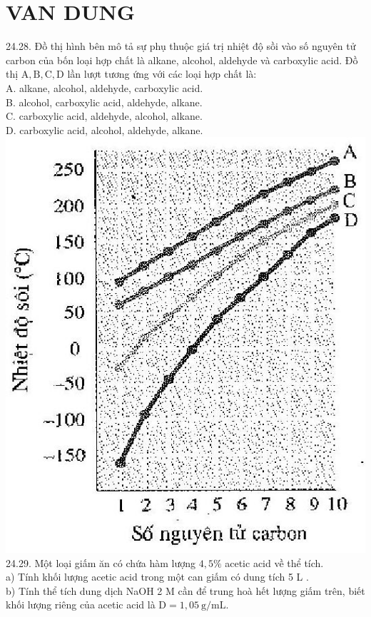 \documentclass[10pt]{article}
\begin{document}
\section*{VAN DUNG}
24.28. Đồ thị hình bên mô tả sự phụ thuộc giá trị nhiệt độ sồi vào số nguyên tử carbon của bốn loại hợp chất là alkane, alcohol, aldehyde và carboxylic acid. Đồ thị $\mathrm{A}, \mathrm{B}, \mathrm{C}, \mathrm{D}$ lần lượt tương ứng với các loại hợp chất là:\\
A. alkane, alcohol, aldehyde, carboxylic acid.\\
B. alcohol, carboxylic acid, aldehyde, alkane.\\
C. carboxylic acid, aldehyde, alcohol, alkane.\\
D. carboxylic acid, alcohol, aldehyde, alkane.\\
\includegraphics[max width=\textwidth, center]{2025_10_23_fa9073eecee116ad8cf2g-86(3)}\\
24.29. Một loại giấm ăn có chứa hàm lượng $4,5 \%$ acetic acid về thể tích.\\
a) Tính khối lượng acetic acid trong một can giấm có dung tích 5 L .\\
b) Tính thể tích dung dịch NaOH 2 M cần để trung hoà hết lượng giấm trên, biết khối lượng riêng của acetic acid là $\mathrm{D}=1,05 \mathrm{~g} / \mathrm{mL}$.
\end{document}
